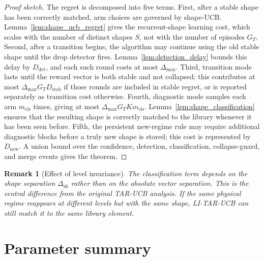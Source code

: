 \documentclass[11pt]{article}
\newtheorem{remark}{Remark}
\begin{document}
\begin{proof}[Proof sketch]
The regret is decomposed into five terms. First, after a stable shape has been correctly matched, arm choices are governed by shape-UCB. Lemma~\ref{lem:shape_ucb_regret} gives the recurrent-shape learning cost, which scales with the number of distinct shapes $S$, not with the number of episodes $G_T$. Second, after a transition begins, the algorithm may continue using the old stable shape until the drop detector fires. Lemma~\ref{lem:detection_delay} bounds this delay by $D_{\mathrm{det}}$, and each such round costs at most $\Delta_{\max}$. Third, transition mode lasts until the reward vector is both stable and not collapsed; this contributes at most $\Delta_{\max}G_TD_{\mathrm{stab}}$ if those rounds are included in stable regret, or is reported separately as transition cost otherwise. Fourth, diagnostic mode samples each arm $m_{\mathrm{cls}}$ times, giving at most $\Delta_{\max}G_TK m_{\mathrm{cls}}$. Lemma~\ref{lem:shape_classification} ensures that the resulting shape is correctly matched to the library whenever it has been seen before. Fifth, the persistent new-regime rule may require additional diagnostic blocks before a truly new shape is stored; this cost is represented by $D_{\mathrm{new}}$. A union bound over the confidence, detection, classification, collapse-guard, and merge events gives the theorem.
\end{proof}

\begin{remark}[Effect of level invariance]
The classification term depends on the shape separation $\Delta_{\mathrm{sh}}$ rather than on the absolute vector separation. This is the central difference from the original TAR-UCB analysis. If the same physical regime reappears at different levels but with the same shape, LI-TAR-UCB can still match it to the same library element.
\end{remark}

\section{Parameter summary}
\label{sec:parameters}
\end{document}
